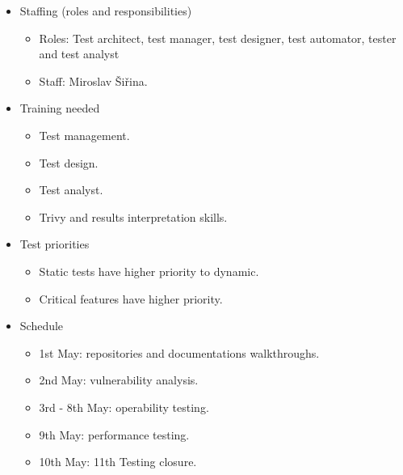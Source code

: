 \begin{itemize}
\begin{itemize}
              \item Staffing (roles and responsibilities)
                    \begin{itemize}
                        \item Roles: Test architect, test manager, test designer, test automator, tester and test analyst
                        \item Staff: Miroslav Šiřina.
                    \end{itemize}
              \item Training needed
                    \begin{itemize}
                        \item Test management.
                        \item Test design.
                        \item Test analyst.
                        \item Trivy and results interpretation skills.
                    \end{itemize}
              \item Test priorities
                    \begin{itemize}
                        \item Static tests have higher priority to dynamic.
                        \item Critical features have higher priority.
                    \end{itemize}
              \item Schedule
                    \begin{itemize}
                        \item 1st May: repositories and documentations walkthroughs.
                        \item 2nd May: vulnerability analysis.
                        \item 3rd - 8th May: operability testing.
                        \item 9th May:  performance testing.
                        \item 10th May: 11th Testing closure.
                    \end{itemize}
          \end{itemize}
\end{itemize}


